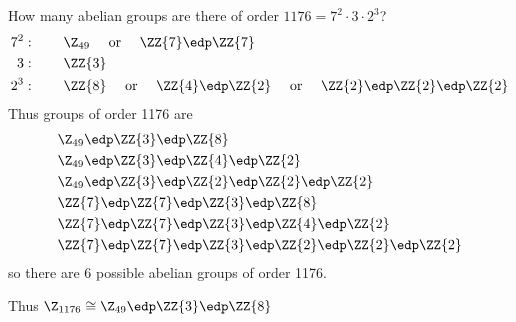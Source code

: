 \begin{example}
    How many abelian groups are there of order \(1176 = 7^2\cdot 3\cdot 2^3\)?
    \begin{align*}
        7^2 &: \qquad \Z_{49} \quad \text{ or } \quad \ZZ{7}\edp\ZZ{7} \\
        3   &: \qquad \ZZ{3} \\
        2^3 &: \qquad \ZZ{8} \quad \text{ or } \quad \ZZ{4} \edp \ZZ{2} \quad \text{ or } \quad \ZZ{2} \edp \ZZ{2} \edp \ZZ{2}
    \end{align*}
    Thus groups of order 1176 are
    \begin{align*}
        &\Z_{49} \edp \ZZ{3} \edp \ZZ{8} \\
        &\Z_{49} \edp \ZZ{3} \edp \ZZ{4} \edp \ZZ{2} \\
        &\Z_{49} \edp \ZZ{3} \edp \ZZ{2} \edp \ZZ{2} \edp \ZZ{2} \\
        &\ZZ{7} \edp \ZZ{7} \edp \ZZ{3} \edp \ZZ{8} \\
        &\ZZ{7} \edp \ZZ{7} \edp \ZZ{3} \edp \ZZ{4} \edp \ZZ{2} \\
        &\ZZ{7} \edp \ZZ{7} \edp \ZZ{3} \edp \ZZ{2} \edp \ZZ{2} \edp \ZZ{2}
    \end{align*} so there are 6 possible abelian groups of order 1176.

    Thus \(\Z_{1176}\cong \Z_{49} \edp \ZZ{3} \edp \ZZ{8}\)
\end{example}